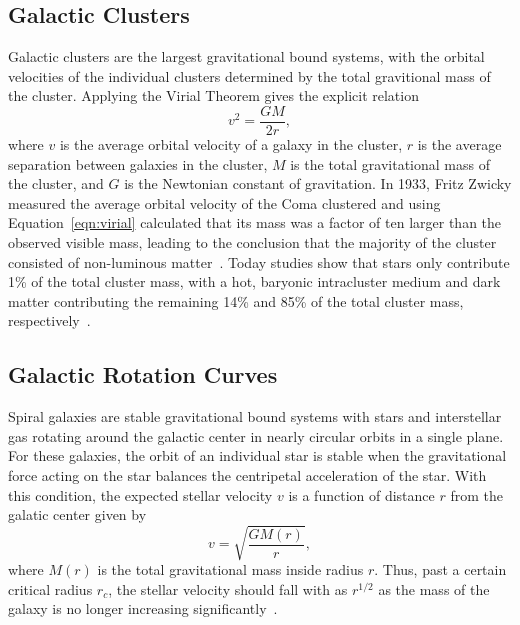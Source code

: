 \subsection{Galactic Clusters}
\label{sec:dm_clusters}

Galactic clusters are the largest gravitational bound systems, with the orbital velocities of the individual clusters determined by the total gravitional mass of the cluster. Applying the Virial Theorem gives the explicit relation
\begin{equation}
  \label{eqn:virial}
  v^2 = \frac{GM}{2r},
\end{equation}
where $v$ is the average orbital velocity of a galaxy in the cluster, $r$ is the average separation between galaxies in the cluster, $M$ is the total gravitational mass of the cluster, and $G$ is the Newtonian constant of gravitation.
In 1933, Fritz Zwicky measured the average orbital velocity of the Coma clustered and using Equation~\ref{eqn:virial} calculated that its mass was a factor of ten larger than the observed visible mass, leading to the conclusion that the majority of the cluster consisted of non-luminous matter~\cite{Zwicky1933}.
Today studies show that stars only contribute 1\% of the total cluster mass, with a hot, baryonic intracluster medium and dark matter contributing the remaining 14\% and 85\% of the total cluster mass, respectively~\cite{Roos2010}.

\subsection{Galactic Rotation Curves}
\label{sec:dm_curves}

Spiral galaxies are stable gravitational bound systems with stars and interstellar gas rotating around the galactic center in nearly circular orbits in a single plane.
For these galaxies, the orbit of an individual star is stable when the gravitational force acting on the star balances the centripetal acceleration of the star.
With this condition, the expected stellar velocity $v$ is a function of distance $r$ from the galatic center given by
\begin{equation}
  v = \sqrt{\frac{GM(r)}{r}},
\end{equation}
where $M(r)$ is the total gravitational mass inside radius $r$.
Thus, past a certain critical radius $r_c$, the stellar velocity should fall with as $r^{1/2}$ as the mass of the galaxy is no longer increasing significantly~\cite{Damico2009}.

